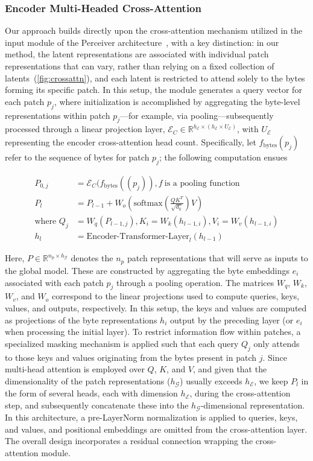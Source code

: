 \subsubsection{Encoder Multi-Headed Cross-Attention}
\label{sec:enc-cross-attn}
Our approach builds directly upon the cross-attention mechanism utilized in the input module of the Perceiver architecture~\citep{jaegle2021perceiver}, with a key distinction: in our method, the latent representations are associated with individual patch representations that can vary, rather than relying on a fixed collection of latents~(\autoref{fig:crossattn}), and each latent is restricted to attend solely to the bytes forming its specific patch. In this setup, the module generates a query vector for each patch $p_j$, where initialization is accomplished by aggregating the byte-level representations within patch $p_j$—for example, via pooling—subsequently processed through a linear projection layer, $\mathcal{E}_{C} \in \mathbb{R}^{h_{\mathcal{E}} \times (h_{\mathcal{E}} \times U_{\mathcal{E}})}$, with $U_{\mathcal{E}}$ representing the encoder cross-attention head count. Specifically, let $f_{\text{bytes}}(p_j)$ refer to the sequence of bytes for patch $p_j$; the following computation ensues

\begin{align}
P_{0,j} &= \mathcal{E}_{C}(f_\text{bytes}((p_j)), f~ \text{is a pooling function} \\
P_l &= P_{l-1} + W_o\left(\text{softmax}\left(\frac{QK^T}{\sqrt{d_k}}\right)V\right) \\
\text{where } Q_j &= W_q(P_{l-1,j}), K_i = W_k(h_{l-1,i}), V_i = W_v(h_{l-1,i}) \\
h_l &= \text{Encoder-Transformer-Layer}_l(h_{l-1})
\end{align}

Here, $P \in \mathbb{R}^{n_p \times h_{\mathcal{G}}}$ denotes the $n_p$ patch representations that will serve as inputs to the global model. These are constructed by aggregating the byte embeddings $e_i$ associated with each patch $p_j$ through a pooling operation. The matrices $W_q$, $W_k$, $W_v$, and $W_o$ correspond to the linear projections used to compute queries, keys, values, and outputs, respectively. In this setup, the keys and values are computed as projections of the byte representations $h_i$ output by the preceding layer (or $e_i$ when processing the initial layer). To restrict information flow within patches, a specialized masking mechanism is applied such that each query $Q_j$ only attends to those keys and values originating from the bytes present in patch $j$. Since multi-head attention is employed over $Q$, $K$, and $V$, and given that the dimensionality of the patch representations ($h_{\mathcal{G}}$) usually exceeds $h_{\mathcal{E}}$, we keep $P_l$ in the form of several heads, each with dimension $h_{\mathcal{E}}$, during the cross-attention step, and subsequently concatenate these into the $h_{\mathcal{G}}$-dimensional representation. In this architecture, a pre-LayerNorm normalization is applied to queries, keys, and values, and positional embeddings are omitted from the cross-attention layer. The overall design incorporates a residual connection wrapping the cross-attention module.

